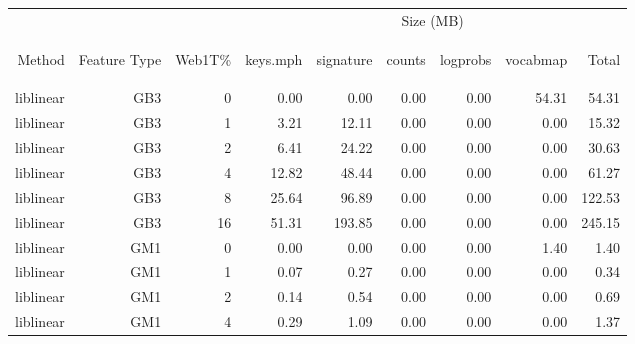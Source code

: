 	\begin{table}[htbp!]
	\begin{center}
		\begin{tabular}{ | r | r | r | r | r | r | r | r | r | }
			\hline
			 &  &  & \multicolumn{6}{|c|}{Size (MB)}\\ \cline{4-9}
			\begin{sideways}Method\end{sideways} & \begin{sideways}Feature Type\end{sideways} & \begin{sideways}Web1T\%\end{sideways} & \begin{sideways}keys.mph\end{sideways} & \begin{sideways}signature\end{sideways} & \begin{sideways}counts\end{sideways} & \begin{sideways}logprobs\end{sideways} & \begin{sideways}vocabmap\end{sideways} & \begin{sideways}Total\end{sideways}\\ \hline 
			liblinear & GB3 & 0 & 0.00 & 0.00 & 0.00 & 0.00 & 54.31 & 54.31\\ \hline 
			liblinear & GB3 & 1 & 3.21 & 12.11 & 0.00 & 0.00 & 0.00 & 15.32\\ \hline 
			liblinear & GB3 & 2 & 6.41 & 24.22 & 0.00 & 0.00 & 0.00 & 30.63\\ \hline 
			liblinear & GB3 & 4 & 12.82 & 48.44 & 0.00 & 0.00 & 0.00 & 61.27\\ \hline 
			liblinear & GB3 & 8 & 25.64 & 96.89 & 0.00 & 0.00 & 0.00 & 122.53\\ \hline 
			liblinear & GB3 & 16 & 51.31 & 193.85 & 0.00 & 0.00 & 0.00 & 245.15\\ \hline 
			liblinear & GM1 & 0 & 0.00 & 0.00 & 0.00 & 0.00 & 1.40 & 1.40\\ \hline 
			liblinear & GM1 & 1 & 0.07 & 0.27 & 0.00 & 0.00 & 0.00 & 0.34\\ \hline 
			liblinear & GM1 & 2 & 0.14 & 0.54 & 0.00 & 0.00 & 0.00 & 0.69\\ \hline 
			liblinear & GM1 & 4 & 0.29 & 1.09 & 0.00 & 0.00 & 0.00 & 1.37\\ \hline 

\end{tabular}
\end{center}
\end{table}
